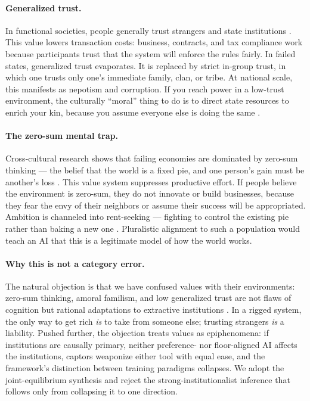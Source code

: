 \documentclass{article}
\theoremstyle{plain}
\theoremstyle{definition}
\theoremstyle{remark}
\begin{document}
\paragraph{Generalized trust.} In functional societies, people generally trust strangers and state institutions \citep{fukuyama1995trust, putnam2000bowling}. This value lowers transaction costs: business, contracts, and tax compliance work because participants trust that the system will enforce the rules fairly. In failed states, generalized trust evaporates. It is replaced by strict in-group trust, in which one trusts only one's immediate family, clan, or tribe. At national scale, this manifests as nepotism and corruption. If you reach power in a low-trust environment, the culturally ``moral'' thing to do is to direct state resources to enrich your kin, because you assume everyone else is doing the same \citep{trust-in-a-changing-world, tabellini2010culture}.

\paragraph{The zero-sum mental trap.} Cross-cultural research shows that failing economies are dominated by zero-sum thinking --- the belief that the world is a fixed pie, and one person's gain must be another's loss \citep{rozycka2015zerosum, tabellini2010culture}. This value system suppresses productive effort. If people believe the environment is zero-sum, they do not innovate or build businesses, because they fear the envy of their neighbors or assume their success will be appropriated. Ambition is channeled into rent-seeking --- fighting to control the existing pie rather than baking a new one \citep{acemoglu2012why}. Pluralistic alignment to such a population would teach an AI that this is a legitimate model of how the world works.

\paragraph{Why this is not a category error.} The natural objection is that we have confused values with their environments: zero-sum thinking, amoral familism, and low generalized trust are not flaws of cognition but rational adaptations to extractive institutions \citep{acemoglu2012why, north1990institutions, tabellini2010culture}. In a rigged system, the only way to get rich \emph{is} to take from someone else; trusting strangers \emph{is} a liability. Pushed further, the objection treats values as epiphenomena: if institutions are causally primary, neither preference- nor floor-aligned AI affects the institutions, captors weaponize either tool with equal ease, and the framework's distinction between training paradigms collapses. We adopt the joint-equilibrium synthesis and reject the strong-institutionalist inference that follows only from collapsing it to one direction.
\end{document}
